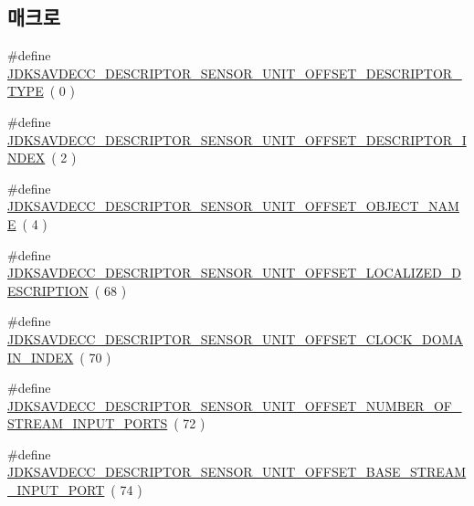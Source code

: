 \subsection*{매크로}
\begin{DoxyCompactItemize}
\item 
\#define \hyperlink{group__descriptor__sensor_gaf14ef224a8a2fd9647c8c327b14092ba}{J\+D\+K\+S\+A\+V\+D\+E\+C\+C\+\_\+\+D\+E\+S\+C\+R\+I\+P\+T\+O\+R\+\_\+\+S\+E\+N\+S\+O\+R\+\_\+\+U\+N\+I\+T\+\_\+\+O\+F\+F\+S\+E\+T\+\_\+\+D\+E\+S\+C\+R\+I\+P\+T\+O\+R\+\_\+\+T\+Y\+PE}~( 0 )
\item 
\#define \hyperlink{group__descriptor__sensor_ga27cea08e577d73fa9ae79781bc4118cc}{J\+D\+K\+S\+A\+V\+D\+E\+C\+C\+\_\+\+D\+E\+S\+C\+R\+I\+P\+T\+O\+R\+\_\+\+S\+E\+N\+S\+O\+R\+\_\+\+U\+N\+I\+T\+\_\+\+O\+F\+F\+S\+E\+T\+\_\+\+D\+E\+S\+C\+R\+I\+P\+T\+O\+R\+\_\+\+I\+N\+D\+EX}~( 2 )
\item 
\#define \hyperlink{group__descriptor__sensor_ga34207e70f67c5e7c396e6c66c757fad3}{J\+D\+K\+S\+A\+V\+D\+E\+C\+C\+\_\+\+D\+E\+S\+C\+R\+I\+P\+T\+O\+R\+\_\+\+S\+E\+N\+S\+O\+R\+\_\+\+U\+N\+I\+T\+\_\+\+O\+F\+F\+S\+E\+T\+\_\+\+O\+B\+J\+E\+C\+T\+\_\+\+N\+A\+ME}~( 4 )
\item 
\#define \hyperlink{group__descriptor__sensor_gaea9805eb2c996c37916c2e3ea96cfb3c}{J\+D\+K\+S\+A\+V\+D\+E\+C\+C\+\_\+\+D\+E\+S\+C\+R\+I\+P\+T\+O\+R\+\_\+\+S\+E\+N\+S\+O\+R\+\_\+\+U\+N\+I\+T\+\_\+\+O\+F\+F\+S\+E\+T\+\_\+\+L\+O\+C\+A\+L\+I\+Z\+E\+D\+\_\+\+D\+E\+S\+C\+R\+I\+P\+T\+I\+ON}~( 68 )
\item 
\#define \hyperlink{group__descriptor__sensor_gac8ea8a05694108dfee410575f12cdf25}{J\+D\+K\+S\+A\+V\+D\+E\+C\+C\+\_\+\+D\+E\+S\+C\+R\+I\+P\+T\+O\+R\+\_\+\+S\+E\+N\+S\+O\+R\+\_\+\+U\+N\+I\+T\+\_\+\+O\+F\+F\+S\+E\+T\+\_\+\+C\+L\+O\+C\+K\+\_\+\+D\+O\+M\+A\+I\+N\+\_\+\+I\+N\+D\+EX}~( 70 )
\item 
\#define \hyperlink{group__descriptor__sensor_ga72f9067f3d4c6cc37887af578ca91c04}{J\+D\+K\+S\+A\+V\+D\+E\+C\+C\+\_\+\+D\+E\+S\+C\+R\+I\+P\+T\+O\+R\+\_\+\+S\+E\+N\+S\+O\+R\+\_\+\+U\+N\+I\+T\+\_\+\+O\+F\+F\+S\+E\+T\+\_\+\+N\+U\+M\+B\+E\+R\+\_\+\+O\+F\+\_\+\+S\+T\+R\+E\+A\+M\+\_\+\+I\+N\+P\+U\+T\+\_\+\+P\+O\+R\+TS}~( 72 )
\item 
\#define \hyperlink{group__descriptor__sensor_gacc31cf32208e17387f0853b38bea0951}{J\+D\+K\+S\+A\+V\+D\+E\+C\+C\+\_\+\+D\+E\+S\+C\+R\+I\+P\+T\+O\+R\+\_\+\+S\+E\+N\+S\+O\+R\+\_\+\+U\+N\+I\+T\+\_\+\+O\+F\+F\+S\+E\+T\+\_\+\+B\+A\+S\+E\+\_\+\+S\+T\+R\+E\+A\+M\+\_\+\+I\+N\+P\+U\+T\+\_\+\+P\+O\+RT}~( 74 )
\item 

\end{DoxyCompactItemize}
